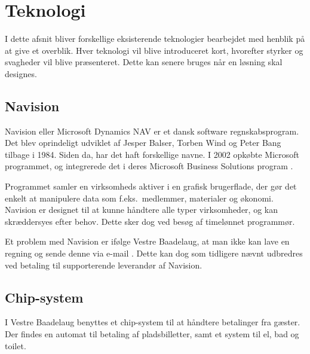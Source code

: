 \section{Teknologi} %
\label{sec:Teknologi}

I dette afsnit bliver forskellige eksisterende teknologier bearbejdet med henblik på at give et overblik. Hver teknologi vil blive introduceret kort, hvorefter styrker og svagheder vil blive præsenteret. Dette kan senere bruges når en løsning skal designes.


\subsection{Navision} %
\label{sub:Navision}

Navision eller Microsoft Dynamics NAV er et dansk software regnskabsprogram. Det blev oprindeligt udviklet af Jesper Balser, Torben Wind og Peter Bang tilbage i 1984. Siden da, har det haft forskellige navne. I 2002 opkøbte Microsoft programmet, og integrerede det i deres Microsoft Business Solutions program \cite{visiondata}.

Programmet samler en virksomheds aktiver i en grafisk brugerflade, der gør det enkelt at manipulere data som f.eks.\ medlemmer, materialer og økonomi. Navision er designet til at kunne håndtere alle typer virksomheder, og kan skræddersyes efter behov. Dette sker dog ved besøg af timelønnet programmør.



Et problem med Navision er ifølge Vestre Baadelaug, at man ikke kan lave en regning og sende denne via e-mail \cite{int_vb_sl}. Dette kan dog som tidligere nævnt udbredres ved betaling til supporterende leverandør af Navision.


\subsection{Chip-system} %
\label{sub:Chip}

I Vestre Baadelaug benyttes et chip-system til at håndtere betalinger fra gæster. Der findes en automat til betaling af pladsbilletter, samt et system til el, bad og toilet.

